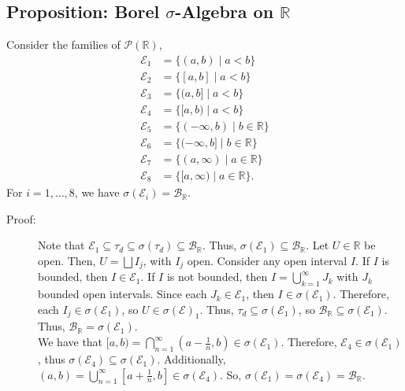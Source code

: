 \documentclass[10pt]{extarticle}
\newcommand{\R}{\mathbb{R}}
\begin{document}
  \subsection{Proposition: Borel $\sigma$-Algebra on $\R$}%
  Consider the families of $\mathcal{P}(\R)$,
  \begin{align*}
    \mathcal{E}_1 &= \{(a,b)\mid a < b\}\\
    \mathcal{E}_2 &= \{[a,b]\mid a<b \}\\
    \mathcal{E}_3 &= \{(a,b]\mid a < b\}\\
    \mathcal{E}_4 &= \{[a,b)\mid a < b\}\\
    \mathcal{E}_5 &= \{(-\infty,b)\mid b\in \R\}\\
    \mathcal{E}_6 &= \{(-\infty,b]\mid b\in \R\}\\
    \mathcal{E}_7 &= \{(a,\infty)\mid a\in \R\}\\
    \mathcal{E}_8 &= \{[a,\infty)\mid a\in \R\}.
  \end{align*}
  For $i = 1,\dots,8$, we have $\sigma(\mathcal{E}_i) = \mathcal{B}_{\R}$.
  \begin{description}
    \item[Proof:] Note that $\mathcal{E}_1\subseteq \tau_d\subseteq \sigma(\tau_d)\subseteq \mathcal{B}_{\R}$. Thus, $\sigma(\mathcal{E}_1)\subseteq \mathcal{B}_{\R}$. Let $U\in \R$ be open. Then, $U = \bigsqcup I_j$, with $I_j$ open. Consider any open interval $I$. If $I$ is bounded, then $I\in \mathcal{E}_1$. If $I$ is not bounded, then $I = \bigcup_{k=1}^{\infty} J_{k}$ with $J_k$ bounded open intervals. Since each $J_k\in \mathcal{E}_1$, then $I\in \sigma(\mathcal{E}_1)$. Therefore, each $I_j\in \sigma(\mathcal{E}_1)$, so $U\in \sigma(\mathcal{E})_1$. Thus, $\tau_d \subseteq \sigma(\mathcal{E}_1)$, so $\mathcal{B}_{\R}\subseteq \sigma(\mathcal{E}_1)$.\\

      Thus, $\mathcal{B}_{\R} = \sigma(\mathcal{E}_1)$.\\

      We have that $[a,b) = \bigcap_{n=1}^{\infty} \left(a-\frac{1}{n},b\right) \in \sigma(\mathcal{E}_1)$. Therefore, $\mathcal{E}_4\in \sigma(\mathcal{E}_1)$, thus $\sigma(\mathcal{E}_4)\subseteq \sigma(\mathcal{E}_1)$. Additionally, $(a,b) = \bigcup_{n=1}^{\infty}\left[a+\frac{1}{n},b\right]\in \sigma(\mathcal{E}_4)$. So, $\sigma(\mathcal{E}_1) = \sigma(\mathcal{E}_4) = \mathcal{B}_{\R}$.
  \end{description}
\end{document}
